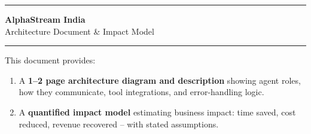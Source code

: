\documentclass[11pt, a4paper]{article}
\begin{document}
\begin{titlepage}
  \centering
  \vspace*{2cm}

  {\color{cyan}\rule{\linewidth}{2.5pt}}
  \vspace{0.8cm}

  {\fontsize{28}{34}\selectfont\bfseries\color{navy}
    AlphaStream India}\\[0.5cm]
  {\LARGE\color{steel}
    Architecture Document \& Impact Model}

  \vspace{0.5cm}
  {\color{cyan}\rule{\linewidth}{2.5pt}}

  \vspace{1.5cm}


  \vspace{1.5cm}

  \begin{infobox}[title={Document Purpose}]
  This document provides:
  \begin{enumerate}[leftmargin=1.4em, itemsep=2pt]
    \item A \textbf{1--2 page architecture diagram and description} showing agent roles,
          how they communicate, tool integrations, and error-handling logic.
    \item A \textbf{quantified impact model} estimating business impact: time saved,
          cost reduced, revenue recovered -- with stated assumptions.
  \end{enumerate}
  \end{infobox}

  \vspace{1.2cm}


\end{titlepage}
\end{document}
